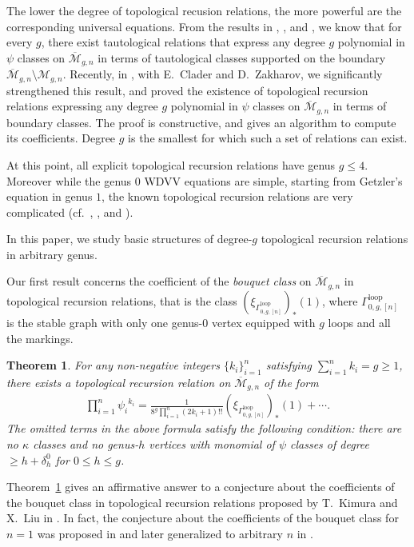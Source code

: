 \documentclass[12pt,reqno]{amsart}
\newcommand{\Gammaloop}{\Gamma^\mathrm{loop}}
\theoremstyle{plain}
\newtheorem{theorem}{Theorem}
\theoremstyle{definition}
\theoremstyle{remark}
\begin{document}
The lower the degree of topological recusion relations, the more powerful are the corresponding universal equations.
From the results in \cite{ionel2002topological}, \cite{faber2005relative}, and \cite{graber2005relative}, we know
that for every $g$, there exist tautological relations that express any degree $g$ polynomial in $\psi$ classes on $\overline{\mathcal{M}}_{g,n}$ in terms of tautological classes supported on the boundary $\overline{\mathcal{M}}_{g,n} \setminus \mathcal{M}_{g,n}$.
Recently, in \cite{clader2023topological}, with E.~Clader and D.~Zakharov, we significantly strengthened this result, and proved the existence of topological recursion relations expressing any degree $g$ polynomial in $\psi$ classes on $\overline{\mathcal{M}}_{g,n}$ in terms of boundary classes.
The proof is constructive, and gives an algorithm to compute its coefficients.
Degree $g$ is the smallest for which such a set of relations can exist.

At this point, all explicit topological recursion relations have genus
$g \leq 4$.
Moreover while the genus $0$ WDVV equations are simple, starting from
Getzler's equation in genus $1$, the known topological recursion
relations are very complicated (cf.\ \cite{getzler1997intersection,getzler1998topological}, \cite{belorousski2000descendent}, \cite{kimura2006genus, kimura2015topological} and \cite{wang2020genus}).

In this paper, we study basic structures of degree-$g$ topological recursion relations in arbitrary genus.

Our first result concerns the coefficient of the \emph{bouquet class} on $\overline{\mathcal{M}}_{g,n}$ in topological recursion relations, that is the class $\left(\xi_{\Gammaloop_{0,g,[n]}}\right)_*(1)$, where $\Gammaloop_{0,g,[n]}$ is the stable graph with only one genus-0 vertex equipped with $g$ loops and all the markings.
\begin{theorem}\label{thm:coeff-bouquet}
For any non-negative integers $\{k_i\}_{i=1}^{n}$ satisfying  $\sum_{i=1}^{n}k_i=g\geq1$, there exists a topological recursion relation on $\overline{\mathcal{M}}_{g,n}$ of the form
\begin{align*}
\prod_{i=1}^{n}{\psi_i}^{k_i} =\frac{1}{8^g \prod_{i=1}^{n}(2k_i+1)!!}
\left(\xi_{\Gammaloop_{0,g,[n]}}\right)_*(1)+\cdots.
\end{align*}
The omitted terms in the above formula satisfy the following condition: there are no
$\kappa$ classes and no genus-$h$ vertices with monomial of $\psi$ classes of degree $\geq h+\delta_{h}^0$ for
$0\leq h\leq g$.
\end{theorem}
Theorem~\ref{thm:coeff-bouquet} gives an affirmative answer to a conjecture about the coefficients  of the bouquet class in topological recursion relations proposed by T.~Kimura and X.~Liu in \cite[p.~656]{kimura2006genus}. In fact, the conjecture about the coefficients  of the bouquet class for $n=1$ was proposed  in \cite{kimura2006genus} and later  generalized to arbitrary $n$ in \cite{liu-private}.
\end{document}

